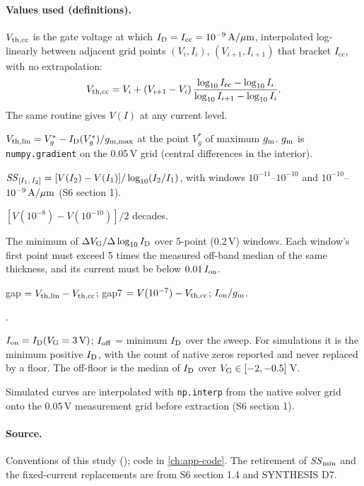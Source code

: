 \paragraph{Values used (definitions).}
\begin{description}[style=nextline,leftmargin=1.2em]
\item[Constant-current threshold.] $V_{\mathrm{th,cc}}$ is the gate voltage at which $I_{\mathrm{D}}=I_{\mathrm{cc}}=10^{-9}\,\mathrm{A}/\mu\mathrm{m}$, interpolated log-linearly between adjacent grid points $(V_i,I_i)$, $(V_{i+1},I_{i+1})$ that bracket $I_{\mathrm{cc}}$, with no extrapolation:
\begin{equation}
  V_{\mathrm{th,cc}} = V_i + (V_{i+1}-V_i)\,\frac{\log_{10}I_{\mathrm{cc}}-\log_{10}I_i}{\log_{10}I_{i+1}-\log_{10}I_i}.
  \label{eq:vthcc}
\end{equation}
The same routine gives $V(I)$ at any current level.
\item[Linear-extrapolation threshold.] $V_{\mathrm{th,lin}} = V_{g}^{*}-I_{\mathrm{D}}(V_g^{*})/g_{\mathrm{m,max}}$ at the point $V_g^{*}$ of maximum $g_{\mathrm{m}}$. $g_{\mathrm{m}}$ is \texttt{numpy.gradient} on the 0.05\,V grid (central differences in the interior).
\item[Fixed-current SS.] $\mathit{SS}_{[I_1,\,I_2]}=[V(I_2)-V(I_1)]/\log_{10}(I_2/I_1)$, with windows $10^{-11}$--$10^{-10}$ and $10^{-10}$--$10^{-9}\,\mathrm{A}/\mu\mathrm{m}$ (S6 section 1).
\item[$\SScc$.] $[V(10^{-8})-V(10^{-10})]/2$ decades.
\item[$\SSmin$ (retired).] The minimum of $\Delta V_{\mathrm{G}}/\Delta\log_{10}I_{\mathrm{D}}$ over 5-point (0.2\,V) windows. Each window's first point must exceed 5 times the measured off-band median of the same thickness, and its current must be below $0.01\,I_{\mathrm{on}}$.
\item[On-state shape.] gap $=V_{\mathrm{th,lin}}-V_{\mathrm{th,cc}}$; gap7 $=V(10^{-7})-V_{\mathrm{th,cc}}$; $I_{\mathrm{on}}/g_{\mathrm{m}}$.
\item[$\muFE$.] .
\item[Currents.] $I_{\mathrm{on}}=I_{\mathrm{D}}(V_{\mathrm{G}}=\SI{3}{V})$; $I_{\mathrm{off}}$ = minimum $I_{\mathrm{D}}$ over the sweep. For simulations it is the minimum positive $I_{\mathrm{D}}$, with the count of native zeros reported and never replaced by a floor. The off-floor is the median of $I_{\mathrm{D}}$ over $V_{\mathrm{G}}\in[-2,-0.5]$\,V.
\end{description}
Simulated curves are interpolated with \texttt{np.interp} from the native solver grid onto the 0.05\,V measurement grid before extraction (S6 section 1).

\paragraph{Source.}
Conventions of this study (); code in \cref{ch:app-code}. The retirement of $\SSmin$ and the fixed-current replacements are from S6 section 1.4 and SYNTHESIS D7.

